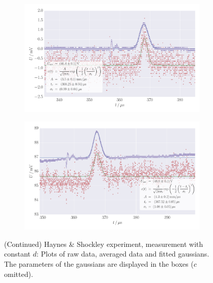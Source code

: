 \begin{figure}
    \centering
    \begin{subfigure}[b]{\pltw}
        \includegraphics[width=1.0\linewidth]{figures/haynes_shockley_raw_U_67}
        \caption{}
        \label{fig:h_s_raw_U_67}
    \end{subfigure}
    \begin{subfigure}[b]{\pltw}
        \includegraphics[width=1.0\linewidth]{figures/haynes_shockley_raw_U_35}
        \caption{}
        \label{fig:h_s_raw_U_35}
    \end{subfigure}
    \caption{
        (Continued)
        Haynes \& Shockley experiment, measurement with constant $d$:
        Plots of raw data, averaged data and fitted gaussians. 
        The parameters of the gaussians are displayed in the boxes 
        ($c$ omitted).
        }
    \label{fig:h_s_raw_plots_U_67_35}
\end{figure}
